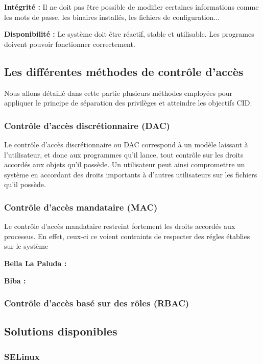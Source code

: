 \textbf{Intégrité :}
Il ne doit pas être possible de modifier certaines informations comme les mots de passe, les binaires installés, les fichiers de configuration...

\textbf{Disponibilité :}
Le système doit être réactif, stable et utilisable. Les programes doivent pouvoir fonctionner correctement.

\subsection{Les différentes méthodes de contrôle d'accès}

Nous allons détaillé dans cette partie plusieurs méthodes employées pour appliquer le principe de séparation des privilèges et atteindre les objectifs CID.

\subsubsection{Contrôle d'accès discrétionnaire (DAC)}

Le contrôle d'accès discrétionnaire ou DAC correspond à un modèle laissant à l'utilisateur, et donc aux programmes qu'il lance, tout contrôle sur les droits accordés aux objets qu'il possède. Un utilisateur peut ainsi compromettre un système en accordant des droits importants à d'autres utilisateurs sur les fichiers qu'il possède.

\subsubsection{Contrôle d'accès mandataire (MAC)}

Le contrôle d'accès mandataire restreint fortement les droits accordés aux processus. En effet, ceux-ci ce voient contraints de respecter des régles établies sur le système

\textbf{Bella La Paluda :}

\textbf{Biba :}

\subsubsection{Contrôle d'accès basé sur des rôles (RBAC)}

\subsection{Solutions disponibles}

\subsubsection{SELinux}

